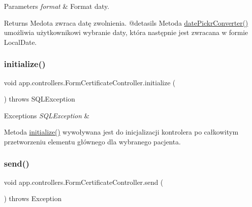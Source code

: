 \begin{DoxyParams}{Parameters}
{\em format} & Format daty. \\
\hline
\end{DoxyParams}
\begin{DoxyReturn}{Returns}
Medota zwraca datę zwolnienia. @detasils Metoda \mbox{\hyperlink{classapp_1_1controllers_1_1_form_certificate_controller_a680747fac245239c02a4b20906e12cd6}{date\+Pickr\+Converter()}} umożliwia użytkownikowi wybranie daty, która następnie jest zwracana w formie Local\+Date. 
\end{DoxyReturn}
\mbox{\label{classapp_1_1controllers_1_1_form_certificate_controller_a87792b2c98ab26177ab519e947f2a076}} 
\subsubsection{\texorpdfstring{initialize()}{initialize()}}
{\footnotesize\ttfamily void app.\+controllers.\+Form\+Certificate\+Controller.\+initialize (\begin{DoxyParamCaption}{ }\end{DoxyParamCaption}) throws S\+Q\+L\+Exception}


\begin{DoxyExceptions}{Exceptions}
{\em S\+Q\+L\+Exception} & \\
\hline
\end{DoxyExceptions}
Metoda \mbox{\hyperlink{classapp_1_1controllers_1_1_form_certificate_controller_a87792b2c98ab26177ab519e947f2a076}{initialize()}} wywoływana jest do inicjalizacji kontrolera po całkowitym przetworzeniu elementu głównego dla wybranego pacjenta. \mbox{\label{classapp_1_1controllers_1_1_form_certificate_controller_aac1957fec1cdad0c0c65873c8835391e}} 
\subsubsection{\texorpdfstring{send()}{send()}}
{\footnotesize\ttfamily void app.\+controllers.\+Form\+Certificate\+Controller.\+send (\begin{DoxyParamCaption}{ }\end{DoxyParamCaption}) throws Exception}


